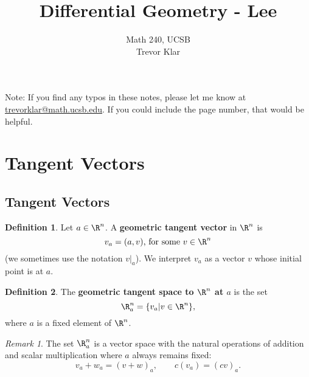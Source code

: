 \documentclass[a5paper]{article}
\title{Differential Geometry - Lee}
\author{Math 240, UCSB \\ Trevor Klar}
\theoremstyle{definition}%
\newtheorem*{definition*}{Definition}
\numberwithin{exercise}{section}
\theoremstyle{remark}%
\newtheorem*{remark*}{Remark}
\begin{document}
\maketitle

\tableofcontents



\begin{highlight}
Note: If you find any typos in these notes, please let me know at \\ \href{mailto:trevorklar@math.ucsb.edu}{trevorklar@math.ucsb.edu}. If you could include the page number, that would be helpful. 

\end{highlight}

\pagebreak
\section{}
\section{}
\pagebreak
\section{Tangent Vectors}
\subsection{Tangent Vectors}

\begin{highlight}
\begin{definition*}
Let $a\in\R^n$. A \textbf{geometric tangent vector} in $\R^n$ is 
$$v_a = (a,v) \text{, for some } v\in\R^n $$ 
(we sometimes use the notation $v|_a$). We interpret $v_a$ as a vector $v$ whose initial point is at $a$. 
\end{definition*}

\begin{definition*}
The \textbf{geometric tangent space to $\R^n$ at $a$} is the set 
$$\R^n_a = \{v_a | v\in\R^n\},$$
where $a$ is a fixed element of $\R^n$. 
\end{definition*}
\end{highlight}

\begin{remark*}
The set $\R^n_a$ is a vector space with the natural operations of addition and scalar multiplication where $a$ always remains fixed:
$$v_a+w_a=(v+w)_a, \quad \quad c(v_a)=(cv)_a.$$
\end{remark*}



 

\end{document}
